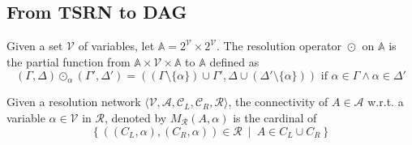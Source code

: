 \documentclass{article}
\newcommand{\parts}[1]{2^{#1}}
\newcommand{\ens}[2]{\left\{ #1 ~ \middle| ~ #2 \right\}}
\newcommand{\varSet}{\mathcal{V}}
\newcommand{\axiomSet}{\mathcal{A}}
\newcommand{\conSet}{\mathcal{C}}
\newcommand{\resoSet}{\mathcal{R}}
\newcommand{\reso}[1]{\odot_{#1}}
\newcommand{\connectivity}[3]{M_{#3} \left( #1 , #2 \right)}
\begin{document}
\subsection{From TSRN to DAG}

Given a set $\varSet$ of variables, let $\mathbb{A} = \parts{\varSet} \times \parts{\varSet}$. The
resolution operator $\reso{}$ on $\mathbb{A}$ is the partial function from $\mathbb{A} \times \varSet
\times \mathbb{A}$ to $\mathbb{A}$ defined as
$$
  (\Gamma,\Delta) \reso{\alpha} (\Gamma',\Delta') =
    ((\Gamma \setminus \{\alpha\}) \cup \Gamma',
     \Delta \cup (\Delta' \setminus \{\alpha\}))
  \text{ if } \alpha \in \Gamma \wedge \alpha \in \Delta'
$$

Given a resolution network $\langle \varSet, \axiomSet, \conSet_L, \conSet_R, \resoSet \rangle$, 
the connectivity of $A \in \axiomSet$ w.r.t. a variable $\alpha \in \varSet$ in $\resoSet$, denoted
by $\connectivity{A}{\alpha}{\resoSet}$ is the cardinal of
$$\ens{((C_L,\alpha),(C_R,\alpha)) \in \resoSet}{A \in C_L \cup C_R}$$
\end{document}
